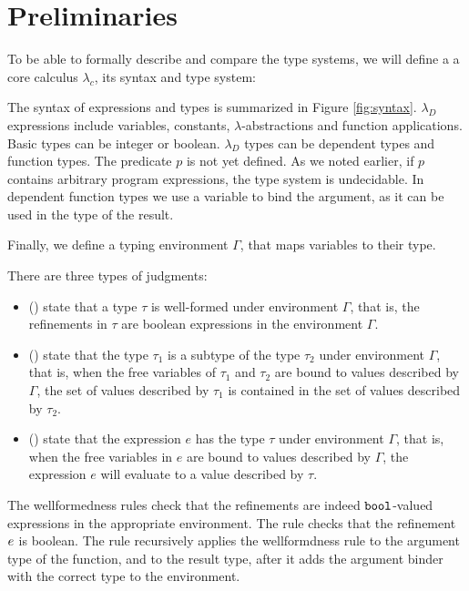 \section{Preliminaries}\label{subsec:formal}

To be able to formally describe and compare the type systems, 
we will define a a core calculus $\lambda_c$, its syntax and type system:

The syntax of expressions and types is summarized in Figure \ref{fig:syntax}.
$\lambda_D$ expressions include variables, constants, $\lambda$-abstractions
and function applications. 
Basic types can be integer or boolean.
$\lambda_D$ types can be dependent types and function types.
The predicate $p$ is
not yet defined. As we noted earlier, if $p$ contains arbitrary program 
expressions, the type system is undecidable.
In dependent function types we use a variable to bind the argument, 
as it can be used in the type of the result.

Finally, we define a typing environment $\Gamma$, that maps variables to their type.


There are three types of judgments:
\begin{itemize}
\item{ (\isWellFormed{\Gamma}{\tau})} 
state that a type $\tau$ is well-formed under environment
$\Gamma$, that is, the refinements in $\tau$ are boolean 
expressions in the environment $\Gamma$.

\item{ ()} 
state that the type $\tau_1$ is a subtype of the type
$\tau_2$ under environment $\Gamma$, that is, when the free variables
of $\tau_1$ and $\tau_2$
are bound to values described by $\Gamma$, the set of values described
by $\tau_1$ is contained in the set of values described by $\tau_2$. 


\item{ ()} state that
the expression $e$ has the type $\tau$ under environment $\Gamma$,
that is, when the free variables in $e$ are bound to values described by 
$\Gamma$, the expression $e$ will evaluate to a value described by $\tau$.
\end{itemize}

The wellformedness rules check that the 
refinements are indeed $\texttt{bool}$-valued expressions in the 
appropriate environment.
The rule \wtBase checks that the  
refinement $e$ is boolean.
The rule \wtFun recursively applies the wellformdness rule to
the argument type of the function, and to the result type, 
after it adds the argument binder with the correct type to 
the environment.

